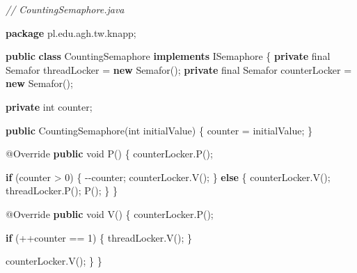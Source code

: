 \documentclass[11pt]{article}
\newenvironment{Shaded}{}{}
\newcommand{\KeywordTok}[1]{\textcolor[rgb]{0.00,0.44,0.13}{\textbf{{#1}}}}
\newcommand{\DataTypeTok}[1]{\textcolor[rgb]{0.56,0.13,0.00}{{#1}}}
\newcommand{\DecValTok}[1]{\textcolor[rgb]{0.25,0.63,0.44}{{#1}}}
\newcommand{\CommentTok}[1]{\textcolor[rgb]{0.38,0.63,0.69}{\textit{{#1}}}}
\newcommand{\FunctionTok}[1]{\textcolor[rgb]{0.02,0.16,0.49}{{#1}}}
\newcommand{\NormalTok}[1]{{#1}}
\newcommand{\ImportTok}[1]{{#1}}
\newcommand{\ControlFlowTok}[1]{\textcolor[rgb]{0.00,0.44,0.13}{\textbf{{#1}}}}
\newcommand{\OperatorTok}[1]{\textcolor[rgb]{0.40,0.40,0.40}{{#1}}}
\newcommand{\AttributeTok}[1]{\textcolor[rgb]{0.49,0.56,0.16}{{#1}}}
\begin{document}
\begin{Shaded}
\begin{Highlighting}[]
\CommentTok{// CountingSemaphore.java}

\KeywordTok{package}\ImportTok{ pl}\OperatorTok{.}\ImportTok{edu}\OperatorTok{.}\ImportTok{agh}\OperatorTok{.}\ImportTok{tw}\OperatorTok{.}\ImportTok{knapp}\OperatorTok{;}

\KeywordTok{public} \KeywordTok{class}\NormalTok{ CountingSemaphore }\KeywordTok{implements}\NormalTok{ ISemaphore }\OperatorTok{\{}
    \KeywordTok{private} \DataTypeTok{final}\NormalTok{ Semafor threadLocker }\OperatorTok{=} \KeywordTok{new} \FunctionTok{Semafor}\OperatorTok{();}
    \KeywordTok{private} \DataTypeTok{final}\NormalTok{ Semafor counterLocker }\OperatorTok{=} \KeywordTok{new} \FunctionTok{Semafor}\OperatorTok{();}

    \KeywordTok{private} \DataTypeTok{int}\NormalTok{ counter}\OperatorTok{;}

    \KeywordTok{public} \FunctionTok{CountingSemaphore}\OperatorTok{(}\DataTypeTok{int}\NormalTok{ initialValue}\OperatorTok{)} \OperatorTok{\{}
\NormalTok{        counter }\OperatorTok{=}\NormalTok{ initialValue}\OperatorTok{;}
    \OperatorTok{\}}

    \AttributeTok{@Override}
    \KeywordTok{public} \DataTypeTok{void} \FunctionTok{P}\OperatorTok{()} \OperatorTok{\{}
\NormalTok{        counterLocker}\OperatorTok{.}\FunctionTok{P}\OperatorTok{();}

        \ControlFlowTok{if} \OperatorTok{(}\NormalTok{counter }\OperatorTok{\textgreater{}} \DecValTok{0}\OperatorTok{)} \OperatorTok{\{}
            \OperatorTok{{-}{-}}\NormalTok{counter}\OperatorTok{;}
\NormalTok{            counterLocker}\OperatorTok{.}\FunctionTok{V}\OperatorTok{();}
        \OperatorTok{\}} \ControlFlowTok{else} \OperatorTok{\{}
\NormalTok{            counterLocker}\OperatorTok{.}\FunctionTok{V}\OperatorTok{();}
\NormalTok{            threadLocker}\OperatorTok{.}\FunctionTok{P}\OperatorTok{();}
            \FunctionTok{P}\OperatorTok{();}
        \OperatorTok{\}}
    \OperatorTok{\}}

    \AttributeTok{@Override}
    \KeywordTok{public} \DataTypeTok{void} \FunctionTok{V}\OperatorTok{()} \OperatorTok{\{}
\NormalTok{        counterLocker}\OperatorTok{.}\FunctionTok{P}\OperatorTok{();}

        \ControlFlowTok{if} \OperatorTok{(++}\NormalTok{counter }\OperatorTok{==} \DecValTok{1}\OperatorTok{)} \OperatorTok{\{}
\NormalTok{            threadLocker}\OperatorTok{.}\FunctionTok{V}\OperatorTok{();}
        \OperatorTok{\}}

\NormalTok{        counterLocker}\OperatorTok{.}\FunctionTok{V}\OperatorTok{();}
    \OperatorTok{\}}
\OperatorTok{\}}
\end{Highlighting}
\end{Shaded}
\end{document}
